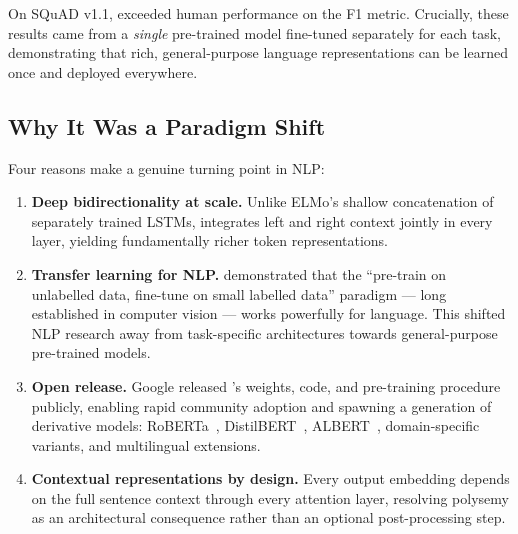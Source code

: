 On SQuAD v1.1, \bert{} exceeded human performance on the F1 metric. Crucially,
these results came from a \emph{single} pre-trained model fine-tuned separately
for each task, demonstrating that rich, general-purpose language representations
can be learned once and deployed everywhere.

\subsection{Why It Was a Paradigm Shift}

Four reasons make \bert{} a genuine turning point in NLP:

\begin{enumerate}[leftmargin=2em, itemsep=3pt]
  \item \textbf{Deep bidirectionality at scale.} Unlike ELMo's shallow
        concatenation of separately trained LSTMs, \bert{} integrates left and
        right context jointly in every layer, yielding fundamentally richer
        token representations.

  \item \textbf{Transfer learning for NLP.} \bert{} demonstrated that the
        ``pre-train on unlabelled data, fine-tune on small labelled data''
        paradigm --- long established in computer vision --- works powerfully for
        language. This shifted NLP research away from task-specific architectures
        towards general-purpose pre-trained models.

  \item \textbf{Open release.} Google released \bert{}'s weights, code, and
        pre-training procedure publicly, enabling rapid community adoption and
        spawning a generation of derivative models: RoBERTa~\cite{liu2019roberta},
        DistilBERT~\cite{sanh2019distilbert}, ALBERT~\cite{lan2019albert},
        domain-specific variants, and multilingual extensions.

  \item \textbf{Contextual representations by design.} Every output embedding
        depends on the full sentence context through every attention layer,
        resolving polysemy as an architectural consequence rather than an
        optional post-processing step.
\end{enumerate}
